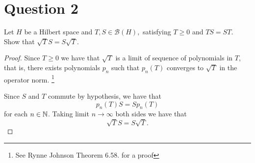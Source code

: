 \section{Question 2}
\horz

Let $H$ be a Hilbert space and $T,S\in \mathcal B(H),$ satisfying $T\geqslant 0$ and $TS=ST.$  Show that $\sqrt{T} S = S \sqrt{T}.$

\horz

\begin{proof}
    Since $T \ge 0$ we have that $\sqrt{T}$ is a limit of sequence of polynomials in $T$, that is, there exists polynomials $p_{n}$ such that $p_{n} (T)$ converges to $\sqrt{T}$ in the operator norm. \footnote{See Rynne Johnson Theorem 6.58. for a proof}

    Since $S$ and $T$ commute by hypothesis, we have that
    \begin{equation*}
	p_{n}\left( T \right) S = S p_{n} \left( T \right) 
    \end{equation*}
    for each $n\in \mathbb N$. Taking limit $n\to \infty$ both sides we have that
    \begin{equation*}
	\sqrt{T} S = S \sqrt{T}.
    \end{equation*}
\end{proof}
